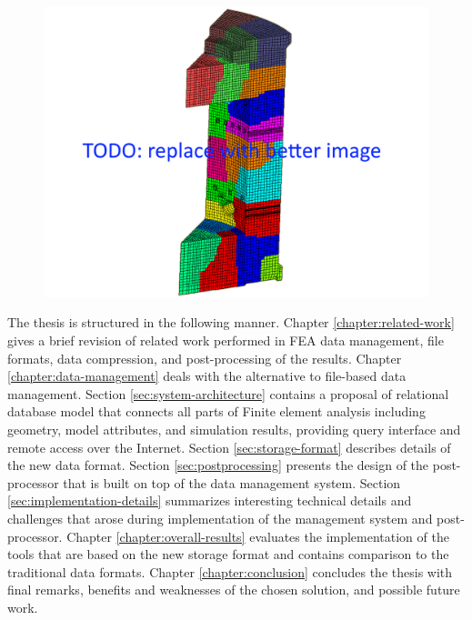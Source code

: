\begin{figure}[H]
\centering
\includegraphics[width=\textwidth]{figures/chapter-introduction/motivation-example}
\decoRule
\caption[]{}
\label{fig:motivation-example}
\end{figure}

The thesis is structured in the following manner. Chapter \ref{chapter:related-work} gives a brief revision of related work performed in FEA data management, file formats, data compression, and post-processing of the results. Chapter \ref{chapter:data-management} deals with the alternative to file-based data management. Section \ref{sec:system-architecture} contains a proposal of relational database model that connects all parts of Finite element analysis including geometry, model attributes, and simulation results, providing query interface and remote access over the Internet. Section \ref{sec:storage-format} describes details of the new data format. Section \ref{sec:postprocessing} presents the design of the post-processor that is built on top of the data management system. Section \ref{sec:implementation-details} summarizes interesting technical details and challenges that arose during implementation of the management system and post-processor. Chapter \ref{chapter:overall-results} evaluates the implementation of the tools that are based on the new storage format and contains comparison to the traditional data formats. Chapter \ref{chapter:conclusion} concludes the thesis with final remarks, benefits and weaknesses of the chosen solution, and possible future work.

